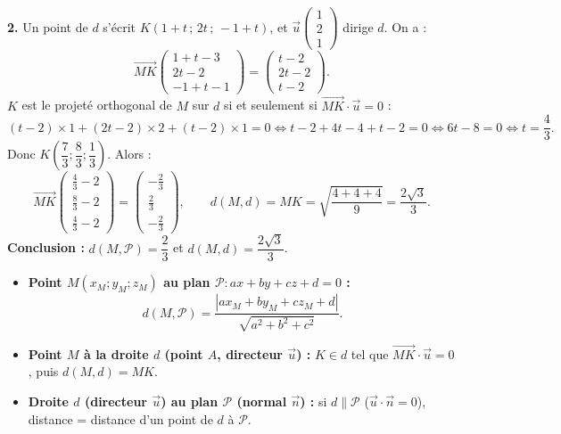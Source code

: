 \documentclass[11pt]{article}
\begin{document}
\begin{exoresolu}
\textbf{2.} Un point de $d$ s'écrit $K(1+t\,;\,2t\,;\,-1+t)$, et $\vec{u}\begin{pmatrix} 1 \\ 2 \\ 1 \end{pmatrix}$ dirige $d$. On a :
\[ \overrightarrow{MK}\begin{pmatrix} 1+t-3 \\ 2t-2 \\ -1+t-1 \end{pmatrix}=\begin{pmatrix} t-2 \\ 2t-2 \\ t-2 \end{pmatrix}. \]
$K$ est le projeté orthogonal de $M$ sur $d$ si et seulement si $\overrightarrow{MK}\cdot\vec{u}=0$ :
\[ (t-2)\times 1+(2t-2)\times 2+(t-2)\times 1=0 \Leftrightarrow t-2+4t-4+t-2=0 \Leftrightarrow 6t-8=0 \Leftrightarrow t=\frac{4}{3}. \]
Donc $K\left(\dfrac{7}{3};\dfrac{8}{3};\dfrac{1}{3}\right)$. Alors :
\[ \overrightarrow{MK}\begin{pmatrix} \frac{4}{3}-2 \\[2pt] \frac{8}{3}-2 \\[2pt] \frac{4}{3}-2 \end{pmatrix}=\begin{pmatrix} -\frac{2}{3} \\[2pt] \frac{2}{3} \\[2pt] -\frac{2}{3} \end{pmatrix}, \qquad d(M,d)=MK=\sqrt{\frac{4+4+4}{9}}=\frac{2\sqrt{3}}{3}. \]
\textbf{Conclusion :} $d(M,\mathcal{P})=\dfrac{2}{3}$ et $d(M,d)=\dfrac{2\sqrt{3}}{3}$.
\end{exoresolu}

\begin{aretenir}
\begin{itemize}
\item \textbf{Point $M(x_M;y_M;z_M)$ au plan $\mathcal{P}:ax+by+cz+d=0$ :}
\[ d(M,\mathcal{P})=\frac{|ax_M+by_M+cz_M+d|}{\sqrt{a^2+b^2+c^2}}. \]
\item \textbf{Point $M$ à la droite $d$ (point $A$, directeur $\vec{u}$) :}
$K\in d$ tel que $\overrightarrow{MK}\cdot\vec{u}=0$, puis $d(M,d)=MK$.
\item \textbf{Droite $d$ (directeur $\vec{u}$) au plan $\mathcal{P}$ (normal $\vec{n}$) :} si $d\parallel\mathcal{P}$ ($\vec{u}\cdot\vec{n}=0$), distance = distance d'un point de $d$ à $\mathcal{P}$.
\end{itemize}
\end{aretenir}
\end{document}
